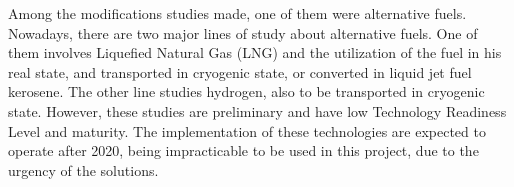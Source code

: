 Among the modifications studies made, one of them were alternative fuels. Nowadays, there are two major lines of study  about alternative fuels. One of them involves Liquefied Natural Gas (LNG) \cite{Wald} and the utilization of the fuel in his real state, and transported in cryogenic state, or converted in liquid jet fuel kerosene. The other line studies hydrogen, also to be transported in cryogenic state. However, these studies are preliminary and have low Technology Readiness Level and maturity. The implementation of these technologies are expected to operate after 2020, being impracticable to be used in this project, due to the urgency of the solutions.
